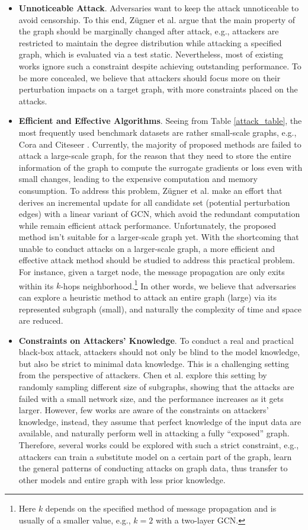\begin{itemize}
	\item \textbf{Unnoticeable Attack}.  Adversaries want to keep the attack unnoticeable to avoid censorship. To this end, Z\"ugner et al. \cite{zugner2019adversarial} argue that the main property of the graph should be marginally changed after attack, e.g., attackers are restricted to maintain the degree distribution while attacking a specified graph, which is evaluated via a test static. Nevertheless, most of existing works ignore such a constraint despite achieving outstanding performance. To be more concealed, we believe that attackers should focus more on their perturbation impacts on a target graph, with more constraints placed on the attacks.
	\item \textbf{Efficient and Effective Algorithms}. Seeing from Table \ref{attack_table}, the most frequently used benchmark datasets are rather small-scale graphs, e.g., Cora \cite{mccallum2000automating} and Citeseer \cite{sen2008collective}. Currently, the majority of proposed methods are failed to attack a large-scale graph, for the reason that they need to store the entire information of the graph to compute the surrogate gradients or loss even with small changes, leading to the expensive computation and memory consumption. To address this problem, Z\"ugner et al. \cite{zugner2019adversarial} make an effort that derives an incremental update for all candidate set (potential perturbation edges) with a linear variant of GCN, which avoid the redundant computation while remain efficient attack performance. Unfortunately, the proposed method isn't suitable for a larger-scale graph yet. With the shortcoming that unable to conduct attacks on a larger-scale graph, a more efficient and effective attack method should be studied to address this practical problem. For instance, given a target node, the message propagation are only exits within its $k$-hops neighborhood.\footnote{Here $k$ depends on the specified method of message propagation and is usually of a smaller value, e.g., $k=2$ with a two-layer GCN.} In other words, we believe that adversaries can explore a heuristic method to attack an entire graph (large) via its represented subgraph (small), and naturally the complexity of time and space  are reduced.
	\item \textbf{Constraints on Attackers' Knowledge}. To conduct a real and practical black-box attack, attackers should not only be blind to the model knowledge, but also be strict to minimal data knowledge. This is a challenging setting from the perspective of attackers. Chen et al. \cite{chen2017practical} explore this setting by randomly sampling different size of subgraphs, showing that the attacks are failed with a small network size, and the performance increases as it gets larger. However, few works are aware of the constraints on attackers' knowledge, instead, they assume that perfect knowledge of the input data are available, and naturally perform well in attacking a fully ``exposed'' graph. Therefore, several works could be explored with such a strict constraint, e.g., attackers can train a substitute model on a certain part of the graph, learn the general patterns of conducting attacks on graph data, thus transfer to other models and entire graph with less prior knowledge.

\end{itemize}
